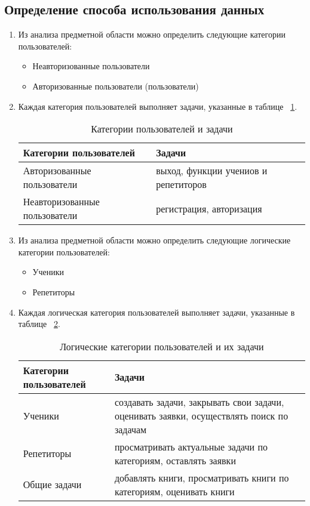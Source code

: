 \subsection{Определение способа использования данных}
\begin{enumerate}

\item Из анализа предметной области можно определить следующие категории пользователей:

\begin{itemize}
\item Неавторизованные пользователи
\item Авторизованные пользователи (пользователи)
\end{itemize}

\item Каждая категория пользователей выполняет задачи, указанные в таблице ~\ref{table:cat-and-task}.
\begin{table}[h]
\caption{Категории пользователей и задачи}\label{table:cat-and-task}
\medskip
\begin{tabular}{|l|p{9cm}|}
\hline
Категории пользователей & Задачи\\
\hline
Авторизованные пользователи & выход, функции учениов и репетиторов \\
Неавторизованные пользователи & регистрация, авторизация\\ 
\hline
\end{tabular}
\end{table}

\item Из анализа предметной области можно определить следующие логические категории пользователей:
\begin{itemize}
\item Ученики
\item Репетиторы
\end{itemize}

\item Каждая логическая категория пользователей выполняет задачи, указанные в таблице ~\ref{table:log-cat-and-task}.
\begin{table}[h]
\caption{Логические категории пользователей и их задачи}\label{table:log-cat-and-task}
\medskip
\begin{tabular}{|l|p{10cm}|}
\hline
Категории пользователей & Задачи\\
\hline
Ученики & создавать задачи, закрывать свои задачи, оценивать заявки, осуществлять поиск по задачам \\
Репетиторы & просматривать актуальные задачи по категориям, оставлять заявки \\
Общие задачи & добавлять книги, просматривать книги по категориям, оценивать книги \\
\hline
\end{tabular}
\end{table}

\end{enumerate}

